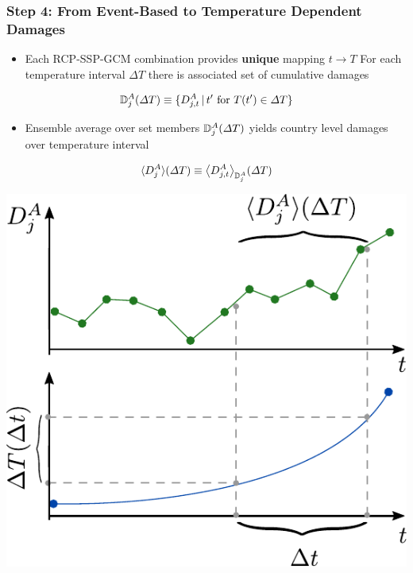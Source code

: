 \documentclass[
c,
11pt,
aspectratio=169, %
final,
]{beamer}
\begin{document}
\begin{frame}
  \frametitle{Step 4: From Event-Based to Temperature Dependent Damages}
  \begin{minipage}[t]{.65\linewidth}
    \vspace{0pt}
  \begin{itemize}
  \item Each RCP-SSP-GCM combination provides \textbf{unique} mapping $t \rightarrow T$
    \arrowitem For each temperature interval $\Delta T$ there is associated set of cumulative damages
  \end{itemize}
    \begin{equation*}
   \mathbb{D}^A_{j}(\Delta T)\equiv\lbrace D^A_{j,t}\, \vert\, t' \text{ for } T(t')\in\Delta T \rbrace
 \end{equation*}
 \vspace{-20pt}
\begin{itemize}
\item Ensemble average over set members $\mathbb{D}^A_{j}(\Delta T)$ yields country level damages over temperature interval  
\end{itemize}
\begin{equation*}
  \langle D^A_{j}\rangle(\Delta T)\equiv\big\langle D^A_{j,t}\big\rangle_{\mathbb{D}^A_{j}}(\Delta T)
\end{equation*}
\end{minipage}\hfill
\begin{minipage}[t]{.35\linewidth}
  \vspace{20pt}
  \centering
  \includegraphics[width=\linewidth]{figures/damage_averaging}
\end{minipage}
\end{frame}
\end{document}
